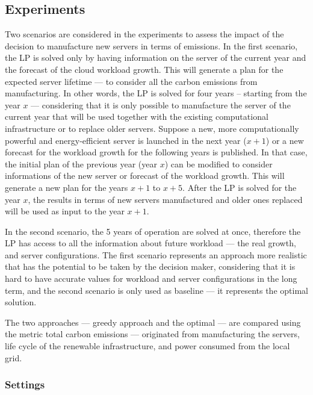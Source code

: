 \subsection{Experiments}


Two scenarios are considered in the experiments to assess the impact of the decision to manufacture new servers in terms of  emissions.  In the first scenario, the LP is solved only by having information on the server of the current year and the forecast of the cloud workload growth. This will generate a plan for the expected server lifetime --- to consider all the carbon emissions from manufacturing. In other words, the LP is solved for four years -- starting from the year $x$ --- considering that it is only possible to manufacture the server of the current year that will be used together with the existing computational infrastructure or to replace older servers. Suppose a new, more computationally powerful and energy-efficient server is launched in the next year ($x+1$) or a new forecast for the workload growth for the following years is published. In that case, the initial plan of the previous year (year $x$) can be modified to consider informations of the new server or forecast of the workload growth. This will generate a new plan for the years $x+1$ to $x+5$. After the LP is solved for the year $x$, the results in terms of new servers manufactured and older ones replaced will be used as input to the year $x +1$. 

In the second scenario, the 5 years of operation are solved at once, therefore the LP has access to all the information about future workload --- the real growth, and server configurations. The first scenario represents an approach more realistic that has the potential to be taken by the decision maker, considering that it is hard to have accurate values for workload and server configurations in the long term, and the second scenario is only used as baseline --- it represents the optimal solution.

The two approaches --- greedy approach and the optimal --- are compared using the metric total carbon emissions --- originated from manufacturing the servers, life cycle of the renewable infrastructure, and power consumed from the local grid.


\subsubsection{Settings}

